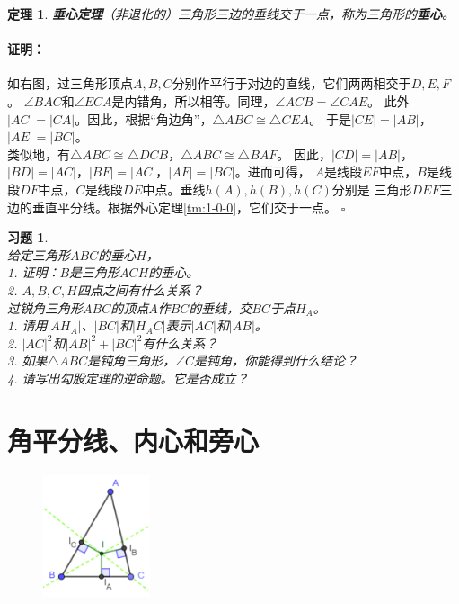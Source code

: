 \documentclass[12pt,UTF8]{ctexbook}
\newtheorem{tm}{定理}[section]
\newenvironment{proof2}{\paragraph{\textbf{证明：}}}{\hfill$\square$}
\newtheorem{xt}{习题}[section]
\begin{document}
\begin{tm}{\textbf{垂心定理}}\label{tm:1-1-0}
    （非退化的）三角形三边的垂线交于一点，称为三角形的\textbf{垂心}。
\end{tm}

\begin{proof2}
    如右图，过三角形顶点$A,B,C$分别作平行于对边的直线，它们两两相交于$D,E,F$。
    $\angle BAC$和$\angle ECA$是内错角，所以相等。同理，$\angle ACB = \angle CAE$。
    此外$|AC| = |CA|$。因此，根据“角边角”，$\triangle ABC \cong \triangle CEA$。
    于是$|CE| = |AB|$，$|AE| = |BC|$。\\
    类似地，有$\triangle ABC \cong \triangle DCB$，$\triangle ABC \cong \triangle BAF$。
    因此，$|CD| = |AB|$，$|BD| = |AC|$，$|BF| = |AC|$，$|AF| = |BC|$。进而可得，
    $A$是线段$EF$中点，$B$是线段$DF$中点，$C$是线段$DE$中点。垂线$h(A), h(B), h(C)$分别是
    三角形$DEF$三边的垂直平分线。根据外心定理\ref{tm:1-0-0}，它们交于一点。
\end{proof2}
\begin{xt}\label{xt:1-1-0}
    \mbox{}\\
    给定三角形$ABC$的垂心$H$，\\
    1. 证明：$B$是三角形$ACH$的垂心。\\
    2. $A,B,C,H$四点之间有什么关系？\\
    过锐角三角形$ABC$的顶点$A$作$BC$的垂线，交$BC$于点$H_A$。\\
    1. 请用$|AH_A|$、$|BC|$和$|H_AC|$表示$|AC|$和$|AB|$。\\
    2. $|AC|^2$和$|AB|^2 + |BC|^2$有什么关系？\\
    3. 如果$\triangle ABC$是钝角三角形，$\angle C$是钝角，你能得到什么结论？\\
    4. 请写出勾股定理的逆命题。它是否成立？
\end{xt}

\section{角平分线、内心和旁心}

\begin{figure} %
    \vspace{-40pt}
    \flushright
    \includegraphics[width=0.28\textwidth]{三角形内心.png}
\end{figure}
\end{document}
